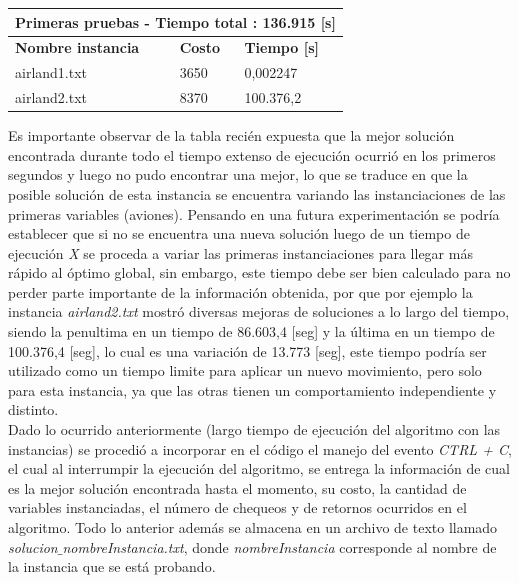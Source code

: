 \documentclass[letter, 10pt]{article}
\begin{document}
\begin{table}[h]
\centering
\begin{tabular}{|l|l|l|}
\hline
\multicolumn{3}{|c|}{\textbf{Primeras pruebas - Tiempo total : 136.915 {[}s{]}}} \\ \hline
\textbf{Nombre instancia}     & \textbf{Costo}     & \textbf{Tiempo {[}s{]}}     \\ \hline
airland1.txt                  & 3650               & 0,002247                    \\ \hline
airland2.txt                  & 8370               & 100.376,2                   \\ \hline
\end{tabular}
\end{table}

Es importante observar de la tabla recién expuesta que la mejor solución encontrada durante todo el tiempo extenso de ejecución ocurrió en los primeros segundos y luego no pudo encontrar una mejor, lo que se traduce en que la posible solución de esta instancia se encuentra variando las instanciaciones de las primeras variables (aviones). Pensando en una futura experimentación se podría establecer que si no se encuentra una nueva solución luego de un tiempo de ejecución \textit{X} se proceda a variar las primeras instanciaciones para llegar más rápido al óptimo global, sin embargo, este tiempo debe ser bien calculado para no perder parte importante de la información obtenida, por que por ejemplo la instancia \textit{airland2.txt} mostró diversas mejoras de soluciones a lo largo del tiempo, siendo la penultima en un tiempo de 86.603,4 [seg] y la última en un tiempo de 100.376,4 [seg], lo cual es una variación de 13.773 [seg], este tiempo podría ser utilizado como un tiempo limite para aplicar un nuevo movimiento, pero solo para esta instancia, ya que las otras tienen un comportamiento independiente y distinto.\\ 

Dado lo ocurrido anteriormente (largo tiempo de ejecución del algoritmo con las instancias) se procedió a incorporar en el código el manejo del evento \textit{CTRL + C}, el cual al interrumpir la ejecución del algoritmo, se entrega la información de cual es la mejor solución encontrada hasta el momento, su costo, la cantidad de variables instanciadas, el número de chequeos y de retornos ocurridos en el algoritmo. Todo lo anterior además se almacena en un archivo de texto llamado \textit{solucion$\_$nombreInstancia.txt}, donde \textit{nombreInstancia} corresponde al nombre de la instancia que se está probando.
\end{document}
